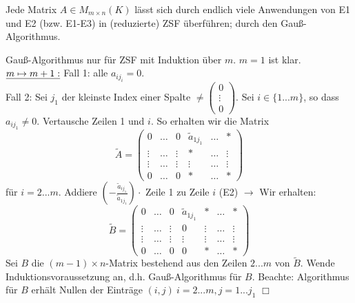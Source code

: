 \begin{satz}
	Jede Matrix $A\in M_{m\times n}(K)$ lässt sich durch endlich viele Anwendungen von E1 und E2 (bzw. E1-E3) in (reduzierte) ZSF überführen; durch den Gauß-Algorithmus.
\end{satz}

\begin{bew}
	Gauß-Algorithmus nur für ZSF mit Induktion über $m$. $m=1$ ist klar.\\
	$\uline{m\mapsto m+1:}$ Fall 1: alle $a_{ij_i}=0$.\\
	Fall 2: Sei $j_1$ der kleinste Index einer Spalte $\neq\begin{pmatrix}
	0\\
	\vdots\\
	0
	\end{pmatrix}$. Sei $i\in\{1...m\}$, so dass $a_{ij_1}\neq 0$. Vertausche Zeilen 1 und $i$. So erhalten wir die Matrix
	\[\tilde{A}=\begin{pmatrix}
	0 & \dots & 0 & \tilde{a}_{1j_1} & \dots & \ast \\
	\vdots & \dots & \vdots & \ast & \dots & \vdots \\
	\vdots & \dots & \vdots & \vdots & \dots & \vdots \\
	0 & \dots & 0 & \ast & \dots & \ast
	\end{pmatrix}\]
	für $i=2...m$. Addiere $(-\tfrac{\tilde{a}_{ij_1}}{\tilde{a}_{1j_1}})\cdot$ Zeile 1 zu Zeile $i$ (E2) $\rightarrow$ Wir erhalten:
	\[\tilde{B}=\begin{pmatrix}
	0 & \dots & 0 & \tilde{a}_{1j_1} & \ast & \dots & \ast \\
	\vdots & \dots & \vdots & 0 & \vdots & \dots & \vdots \\
	\vdots & \dots & \vdots & \vdots & \vdots & \dots & \vdots \\
	0 & \dots & 0 & 0 & \ast & \dots & \ast
	\end{pmatrix}\] 
	Sei $B$ die $(m-1)\times n$-Matrix bestehend aus den Zeilen $2...m$ von $\tilde{B}$. Wende Induktionsvoraussetzung an, d.h. Gauß-Algorithmus für $B$. Beachte: Algorithmus für $B$ erhält Nullen der Einträge $(i,j)\:i=2...m, j=1...j_1$ \hfill $\Box$
\end{bew}

